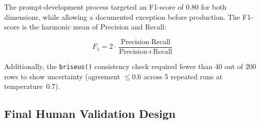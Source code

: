 The prompt-development process targeted an F1-score of 0.80 for both dimensions, while allowing a documented exception before production. The F1-score is the harmonic mean of Precision and Recall:

\begin{equation}
F_1 = 2 \cdot \frac{\text{Precision} \cdot \text{Recall}}{\text{Precision} + \text{Recall}}
\end{equation}

Additionally, the \texttt{briseus()} consistency check required fewer than 40 out of 200 rows to show uncertainty (agreement $\leq 0.6$ across 5 repeated runs at temperature~0.7).

\newpage


\subsection{Final Human Validation Design}
\label{sec:final_human_validation_design}

